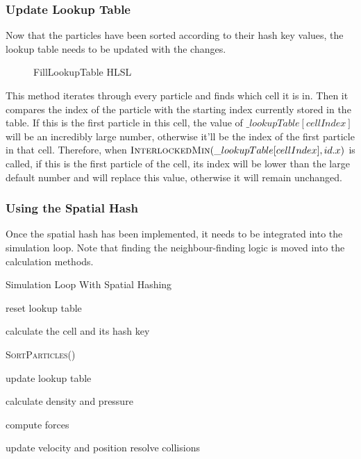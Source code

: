 \documentclass[12pt]{article}
\newcommand{\wideimage}[2][]{%
  \makebox[\textwidth][c]{\texttt{[image: \#2]}}%
}
\begin{document}
    \subsubsection{Update Lookup Table}

    Now that the particles have been sorted according to their hash key values, the lookup table needs to be updated with the changes.

    \begin{figure}[H]
        \begin{center}
            \wideimage[]{updateLookup.png}
            \caption{FillLookupTable HLSL}
        \end{center}
    \end{figure}

    This method iterates through every particle and finds which cell it is in. Then it compares the index of the particle with the starting index currently stored in the table. If this is the first particle in this cell, the value of $\_lookupTable[cellIndex]$ will be an incredibly large number, otherwise it'll be the index of the first particle in that cell. Therefore, when $\textsc{InterlockedMin}(\_lookupTable[cellIndex], id.x)$ is called, if this is the first particle of the cell, its index will be lower than the large default number and will replace this value, otherwise it will remain unchanged.

    \subsubsection{Using the Spatial Hash}

    Once the spatial hash has been implemented, it needs to be integrated into the simulation loop. Note that finding the neighbour-finding logic is moved into the calculation methods.

    \begin{algorithm}[H]
        \caption{Simulation Loop With Spatial Hashing}

        \begin{algorithmic}[1]

            \State reset lookup table

                \State calculate the cell and its hash key
            \EndFor

            \State \textsc{SortParticles}()
            
                \State update lookup table
            \EndFor

                \State calculate density and pressure
            \EndFor

                \State compute forces
            \EndFor

                \State update velocity and position
                \State resolve collisions
            \EndFor
        \end{algorithmic}

    \end{algorithm}
\end{document}
